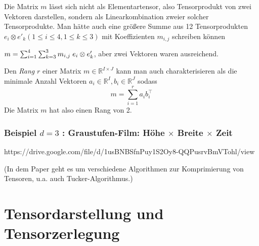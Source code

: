 \documentclass[11pt]{article} %
\theoremstyle{definition}
\numberwithin{equation}{section}
\begin{document}
\begin{changemargin}{0pt}{0pt}
Die Matrix $m$ lässt sich nicht als Elementartensor, also Tensorprodukt von zwei Vektoren darstellen, sondern als Linearkombination zweier solcher
Tensorprodukte. Man hätte auch eine größere Summe aus 12 Tensorprodukten $e_{i} \otimes e'_{k} (1\leq i \leq 4, 1\leq k \leq 3)$ mit
Koeffizienten $m_{i,j}$ schreiben können

$ m = \sum^{4}_{i=1} \sum^{3}_{k=3} m_{i,j} \hspace{1mm} e_{i} \otimes e'_{k} $, aber zwei Vektoren waren ausreichend.

Den \textit{Rang} $r$ einer Matrix $m \in \mathbb{R}^{I\times J}$ kann man auch charakterisieren als die minimale Anzahl Vektoren
$a_{i} \in \mathbb{R}^{I}, b_{i} \in \mathbb{R}^{J}$ sodass
\[ m = \sum^{r}_{i=1} a_{i}b_{i}^{\top} \]
Die Matrix $m$ hat also einen Rang von 2.
\end{changemargin}

\subsubsection{Beispiel $d=3$ : Graustufen-Film: Höhe $\times$ Breite $\times$ Zeit }
\begin{changemargin}{0pt}{0pt}

https://drive.google.com/file/d/1usBNBSfnPuy1S2Oy8-QQPusrvBmVTohl/view \cite{tucker_tensorsketch}

(In dem Paper geht es um verschiedene Algorithmen zur Komprimierung von Tensoren, u.a. auch Tucker-Algorithmus.)

\end{changemargin}

\section{Tensordarstellung und Tensorzerlegung}

\end{document}
